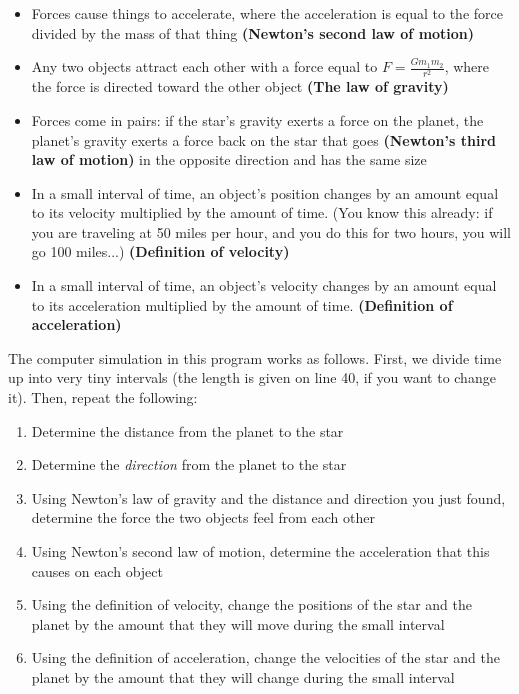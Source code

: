 \documentclass[11pt]{article}
\begin{document}
\begin{itemize}
	\item Forces cause things to accelerate, where the acceleration is equal to the force divided by the mass of that thing {\bf (Newton's second law of motion)}
	\item Any two objects attract each other with a force equal to $F=\frac{Gm_1m_2}{r^2}$, where the force is directed toward the other object {\bf (The law of gravity)}
	\item Forces come in pairs: if the star's gravity exerts a force on the planet, the planet's gravity exerts a force back on the star that goes {\bf (Newton's third law of motion)} in the opposite direction and has the same size
	\item In a small interval of time, an object's position changes by an amount equal to its velocity multiplied by the amount of time. (You know this already: if you are traveling at 50 miles per hour, and you do this for two hours, you will go 100 miles...) {\bf (Definition of velocity)}
	\item In a small interval of time, an object's velocity changes by an amount equal to its acceleration multiplied by the amount of time. {\bf (Definition of acceleration)}
\end{itemize}
\newpage

The computer simulation in this program works as follows. First, we divide time up into very tiny intervals (the length is given on line 40, if you want to change it). Then, repeat the following:

\begin{enumerate}
	\item Determine the distance from the planet to the star
	\item Determine the {\it direction} from the planet to the star
	\item Using Newton's law of gravity and the distance and direction you just found, determine the force the two objects feel from each other
	\item Using Newton's second law of motion, determine the acceleration that this causes on each object
	\item Using the definition of velocity, change the positions of the star and the planet by the amount that they will move during the small interval
	\item Using the definition of acceleration, change the velocities of the star and the planet by the amount that they will change during the small interval
\end{enumerate}
\end{document}
